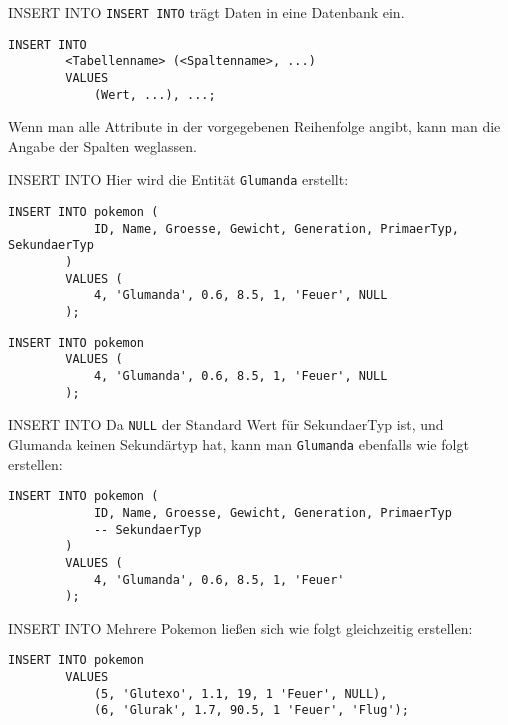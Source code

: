 \begin{sql}{INSERT INTO}
    \texttt{INSERT INTO} trägt Daten in eine Datenbank ein.

    \begin{lstlisting}[language=mysql]
        INSERT INTO
        <Tabellenname> (<Spaltenname>, ...)
        VALUES
            (Wert, ...), ...;
    \end{lstlisting}

    Wenn man alle Attribute in der vorgegebenen Reihenfolge angibt, kann man die Angabe der Spalten weglassen.
\end{sql}

\begin{example}{INSERT INTO}
    Hier wird die Entität \texttt{Glumanda} erstellt:

    \begin{lstlisting}[language=mysql]
        INSERT INTO pokemon (
            ID, Name, Groesse, Gewicht, Generation, PrimaerTyp, SekundaerTyp
        )
        VALUES (
            4, 'Glumanda', 0.6, 8.5, 1, 'Feuer', NULL
        );
    \end{lstlisting}

    \begin{lstlisting}[language=mysql]
        INSERT INTO pokemon
        VALUES (
            4, 'Glumanda', 0.6, 8.5, 1, 'Feuer', NULL
        );
    \end{lstlisting}
\end{example}

\begin{example}{INSERT INTO}
    Da \texttt{NULL} der Standard Wert für SekundaerTyp ist, und Glumanda keinen Sekundärtyp hat, kann man \texttt{Glumanda} ebenfalls wie folgt erstellen:
    
    \begin{lstlisting}[language=mysql]
        INSERT INTO pokemon (
            ID, Name, Groesse, Gewicht, Generation, PrimaerTyp
            -- SekundaerTyp
        )
        VALUES (
            4, 'Glumanda', 0.6, 8.5, 1, 'Feuer'
        );
    \end{lstlisting}
\end{example}

\begin{example}{INSERT INTO}
    Mehrere Pokemon ließen sich wie folgt gleichzeitig erstellen:

    \begin{lstlisting}[language=mysql]
        INSERT INTO pokemon
        VALUES
            (5, 'Glutexo', 1.1, 19, 1 'Feuer', NULL),
            (6, 'Glurak', 1.7, 90.5, 1 'Feuer', 'Flug');
    \end{lstlisting}
\end{example}

